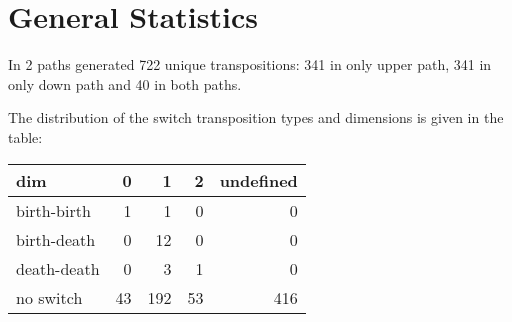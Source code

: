 \documentclass{article}
\begin{document}
\section{General Statistics}
\par In 2 paths generated 722 unique transpositions: 341 in only upper path, 341 in only down path and 40 in both paths.
\par The distribution of the switch transposition types and dimensions is given in the table:
\begin{center}
\begin{tabular}{lrrrr}
\toprule
dim & 0 & 1 & 2 & undefined \\
\midrule
birth-birth & 1 & 1 & 0 & 0 \\
birth-death & 0 & 12 & 0 & 0 \\
death-death & 0 & 3 & 1 & 0 \\
no switch & 43 & 192 & 53 & 416 \\
\bottomrule
\end{tabular}

\end{center}
\end{document}
